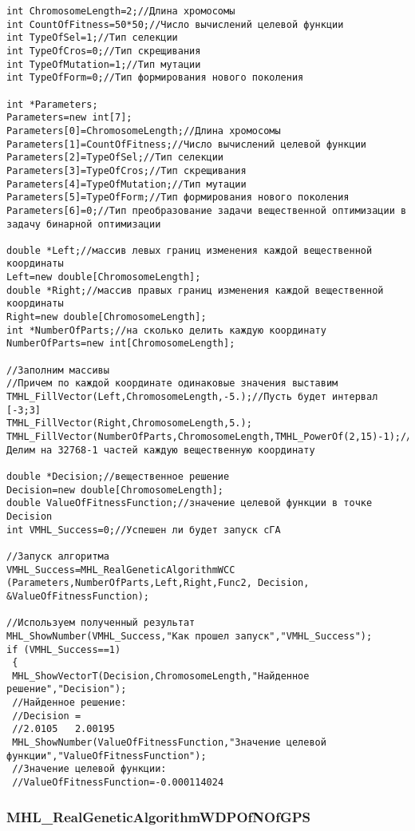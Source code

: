 \documentclass[a4paper,12pt]{article}
\begin{document}
\begin{lstlisting}[label=code_use_MHL_RealGeneticAlgorithmWCC,caption=Пример использования]
int ChromosomeLength=2;//Длина хромосомы
int CountOfFitness=50*50;//Число вычислений целевой функции
int TypeOfSel=1;//Тип селекции
int TypeOfCros=0;//Тип скрещивания
int TypeOfMutation=1;//Тип мутации
int TypeOfForm=0;//Тип формирования нового поколения

int *Parameters;
Parameters=new int[7];
Parameters[0]=ChromosomeLength;//Длина хромосомы
Parameters[1]=CountOfFitness;//Число вычислений целевой функции
Parameters[2]=TypeOfSel;//Тип селекции
Parameters[3]=TypeOfCros;//Тип скрещивания
Parameters[4]=TypeOfMutation;//Тип мутации
Parameters[5]=TypeOfForm;//Тип формирования нового поколения
Parameters[6]=0;//Тип преобразование задачи вещественной оптимизации в задачу бинарной оптимизации

double *Left;//массив левых границ изменения каждой вещественной координаты
Left=new double[ChromosomeLength];
double *Right;//массив правых границ изменения каждой вещественной координаты
Right=new double[ChromosomeLength];
int *NumberOfParts;//на сколько делить каждую координату
NumberOfParts=new int[ChromosomeLength];

//Заполним массивы
//Причем по каждой координате одинаковые значения выставим
TMHL_FillVector(Left,ChromosomeLength,-5.);//Пусть будет интервал [-3;3]
TMHL_FillVector(Right,ChromosomeLength,5.);
TMHL_FillVector(NumberOfParts,ChromosomeLength,TMHL_PowerOf(2,15)-1);//Делим на 32768-1 частей каждую вещественную координату

double *Decision;//вещественное решение
Decision=new double[ChromosomeLength];
double ValueOfFitnessFunction;//значение целевой функции в точке Decision
int VMHL_Success=0;//Успешен ли будет запуск cГА

//Запуск алгоритма
VMHL_Success=MHL_RealGeneticAlgorithmWCC (Parameters,NumberOfParts,Left,Right,Func2, Decision, &ValueOfFitnessFunction);

//Используем полученный результат
MHL_ShowNumber(VMHL_Success,"Как прошел запуск","VMHL_Success");
if (VMHL_Success==1)
 {
 MHL_ShowVectorT(Decision,ChromosomeLength,"Найденное решение","Decision");
 //Найденное решение:
 //Decision =	
 //2.0105	2.00195
 MHL_ShowNumber(ValueOfFitnessFunction,"Значение целевой функции","ValueOfFitnessFunction");
 //Значение целевой функции:
 //ValueOfFitnessFunction=-0.000114024
\end{lstlisting}

\subsubsection{MHL\_RealGeneticAlgorithmWDPOfNOfGPS}\label{MHL_RealGeneticAlgorithmWDPOfNOfGPS}
\end{document}
